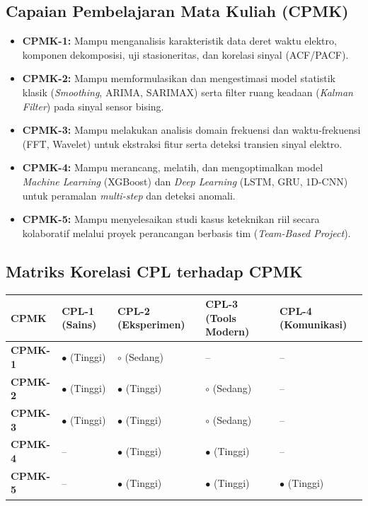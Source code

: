 \documentclass[9.5pt,a4paper]{article}
\begin{document}
\subsection{Capaian Pembelajaran Mata Kuliah (CPMK)}
\begin{itemize}
    \item \textbf{CPMK-1:} Mampu menganalisis karakteristik data deret waktu elektro, komponen dekomposisi, uji stasioneritas, dan korelasi sinyal (ACF/PACF).
    \item \textbf{CPMK-2:} Mampu memformulasikan dan mengestimasi model statistik klasik (\textit{Smoothing}, ARIMA, SARIMAX) serta filter ruang keadaan (\textit{Kalman Filter}) pada sinyal sensor bising.
    \item \textbf{CPMK-3:} Mampu melakukan analisis domain frekuensi dan waktu-frekuensi (FFT, Wavelet) untuk ekstraksi fitur serta deteksi transien sinyal elektro.
    \item \textbf{CPMK-4:} Mampu merancang, melatih, dan mengoptimalkan model \textit{Machine Learning} (XGBoost) dan \textit{Deep Learning} (LSTM, GRU, 1D-CNN) untuk peramalan \textit{multi-step} dan deteksi anomali.
    \item \textbf{CPMK-5:} Mampu menyelesaikan studi kasus keteknikan riil secara kolaboratif melalui proyek perancangan berbasis tim (\textit{Team-Based Project}).
\end{itemize}

\subsection{Matriks Korelasi CPL terhadap CPMK}
\begin{table}[h!]
\centering
\small
\renewcommand{\arraystretch}{1.15}
\begin{tabular}{|C{2.2cm}|C{3.4cm}|C{3.6cm}|C{3.6cm}|C{3.4cm}|}
\hline
{}
\textbf{CPMK} & \textbf{CPL-1 (Sains)} & \textbf{CPL-2 (Eksperimen)} & \textbf{CPL-3 (Tools Modern)} & \textbf{CPL-4 (Komunikasi)} \\ \hline
\textbf{CPMK-1} & $\bullet$ (Tinggi) & $\circ$ (Sedang) & -- & -- \\ \hline
\textbf{CPMK-2} & $\bullet$ (Tinggi) & $\bullet$ (Tinggi) & $\circ$ (Sedang) & -- \\ \hline
\textbf{CPMK-3} & $\bullet$ (Tinggi) & $\bullet$ (Tinggi) & $\circ$ (Sedang) & -- \\ \hline
\textbf{CPMK-4} & -- & $\bullet$ (Tinggi) & $\bullet$ (Tinggi) & -- \\ \hline
\textbf{CPMK-5} & -- & $\bullet$ (Tinggi) & $\bullet$ (Tinggi) & $\bullet$ (Tinggi) \\ \hline
\end{tabular}
\end{table}
\end{document}
